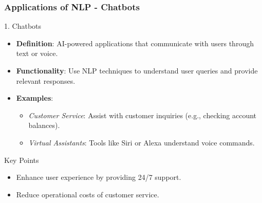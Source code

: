 \documentclass[aspectratio=169]{beamer}
\begin{document}
\begin{frame}[fragile]
    \frametitle{Applications of NLP - Chatbots}
    \begin{block}{1. Chatbots}
        \begin{itemize}
            \item \textbf{Definition}: AI-powered applications that communicate with users through text or voice.
            \item \textbf{Functionality}: Use NLP techniques to understand user queries and provide relevant responses.
            \item \textbf{Examples}:
            \begin{itemize}
                \item \textit{Customer Service}: Assist with customer inquiries (e.g., checking account balances).
                \item \textit{Virtual Assistants}: Tools like Siri or Alexa understand voice commands.
            \end{itemize}
        \end{itemize}
    \end{block}
    \begin{block}{Key Points}
        \begin{itemize}
            \item Enhance user experience by providing 24/7 support.
            \item Reduce operational costs of customer service.
        \end{itemize}
    \end{block}
\end{frame}
\end{document}
